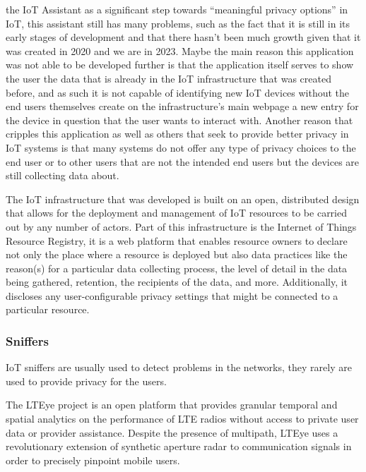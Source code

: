 the IoT Assistant as a significant step towards ``meaningful privacy options''
in IoT, this assistant still has many problems, such as the fact that it
is still in its early stages of development and that there hasn't been much
growth given that it was created in 2020 and we are in 2023. Maybe the main
reason this application was not able to be developed further is that the
application itself serves to show the user the data that is already in the
IoT infrastructure that was created before, and as such it is not capable
of identifying new IoT devices without the end users themselves create on
the infrastructure's main webpage \cite{DasPersonalized} a new entry for
the device in question that the user wants to interact with. Another reason
that cripples this application as well as others that seek to provide better
privacy in IoT systems is that many systems do not offer any type of privacy
choices to the end user or to other users that are not the intended end
users but the devices are still collecting data about.

The IoT infrastructure that was developed \cite{DasPersonalized} is built
on an open, distributed design that allows for the deployment and management
of IoT resources to be carried out by any number of actors. Part of this
infrastructure is the Internet of Things Resource Registry, it is a web
platform that enables resource owners to declare not only the place where
a resource is deployed but also data practices like the reason(s) for a
particular data collecting process, the level of detail in the data being
gathered, retention, the recipients of the data, and more. Additionally,
it discloses any user-configurable privacy settings that might be connected
to a particular resource.

\subsubsection{Sniffers}

IoT sniffers are usually used to detect problems in the networks, they rarely
are used to provide privacy for the users.

The LTEye project \cite{KumarLTE} is an open platform that provides granular
temporal and spatial analytics on the performance of LTE radios without access
to private user data or provider assistance. Despite the presence of multipath,
LTEye uses a revolutionary extension of synthetic aperture radar to communication
signals in order to precisely pinpoint mobile users.

